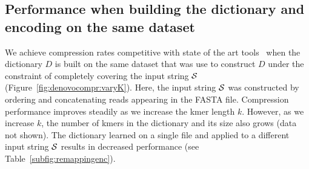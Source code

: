 \documentclass[12pt]{cmuthesis}
\begin{document}
  \begin{table}
  	\centering
	\caption{\textbf{Remapping strategy for encoding uncovered sequence significantly outperforms the two-bit encoding approach.} Each column represents a file on which the dictionary $D$ was trained, while rows represent files which were compressed. Each cell reports a compression ratio (compressed size over original sequence size). Dictionaries were learned for $k = 25$ and under the constraint of complete $\seq$ coverage. Datasets used for these computations: A --- \texttt{SRR519063}, B --- \texttt{SRR635193}, C --- \texttt{ERR233214}.}
	\label{table:denovo:twobitvsremap}
  \end{table}

  \subsection{Performance when building the dictionary and encoding on the same dataset}

  We achieve compression rates competitive with state of the art tools~\cite{Sahinalp2012,Jones2012} when the dictionary $D$ is built on the same dataset that was use to construct $D$ under the constraint of completely covering the input string $\seq$ (Figure~\ref{fig:denovocompr:varyK}). Here, the input string $\seq$ was constructed by ordering and concatenating reads appearing in the FASTA file. Compression performance improves steadily as we increase the kmer length $k$. However, as we increase $k$, the number of kmers in the dictionary and its size also grows (data not shown). The dictionary learned on a single file and applied to a different input string $\seq$ results in decreased performance (see Table~\ref{subfig:remappingenc}).
\end{document}
